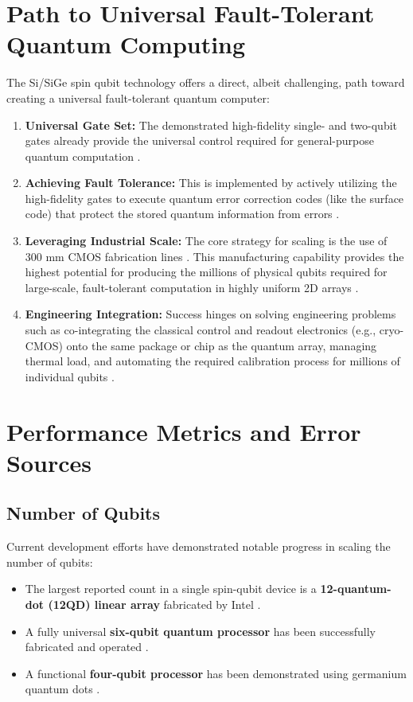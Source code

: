 \section{Path to Universal Fault-Tolerant Quantum Computing}

The Si/SiGe spin qubit technology offers a direct, albeit challenging, path toward creating a universal fault-tolerant quantum computer:

\begin{enumerate}
    \item \textbf{Universal Gate Set:} The demonstrated high-fidelity single- and two-qubit gates already provide the universal control required for general-purpose quantum computation \cite{ref2, ref9, ref12}.
    \item \textbf{Achieving Fault Tolerance:} This is implemented by actively utilizing the high-fidelity gates to execute quantum error correction codes (like the surface code) that protect the stored quantum information from errors \cite{ref1, ref9}.
    \item \textbf{Leveraging Industrial Scale:} The core strategy for scaling is the use of 300 mm CMOS fabrication lines \cite{ref10}. This manufacturing capability provides the highest potential for producing the millions of physical qubits required for large-scale, fault-tolerant computation in highly uniform 2D arrays \cite{ref2, ref9}.
    \item \textbf{Engineering Integration:} Success hinges on solving engineering problems such as co-integrating the classical control and readout electronics (e.g., cryo-CMOS) onto the same package or chip as the quantum array, managing thermal load, and automating the required calibration process for millions of individual qubits \cite{ref2, ref5}.
\end{enumerate}


\section{Performance Metrics and Error Sources}

\subsection{Number of Qubits}
Current development efforts have demonstrated notable progress in scaling the number of qubits:
\begin{itemize}
    \item The largest reported count in a single spin-qubit device is a \textbf{12-quantum-dot (12QD) linear array} fabricated by Intel \cite{ref10}.
    \item A fully universal \textbf{six-qubit quantum processor} has been successfully fabricated and operated \cite{ref11}.
    \item A functional \textbf{four-qubit processor} has been demonstrated using germanium quantum dots \cite{ref9}.
\end{itemize}

